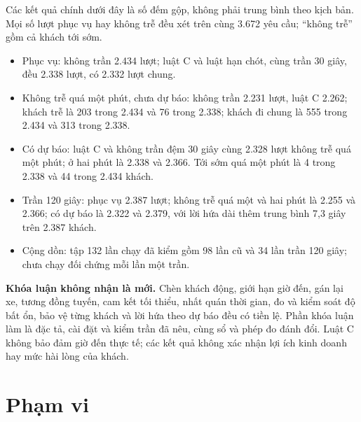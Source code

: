 Các kết quả chính dưới đây là số đếm gộp, không phải trung bình theo kịch bản. Mọi số lượt phục vụ hay không trễ
đều xét trên cùng 3.672 yêu cầu; “không trễ” gồm cả khách tới sớm.
\begin{itemize}[leftmargin=0.7cm,itemsep=2pt,topsep=3pt]
\item Phục vụ: không trần 2.434 lượt; luật C và luật hạn chót, cùng trần 30 giây, đều 2.338 lượt, có 2.332 lượt chung.
\item Không trễ quá một phút, chưa dự báo: không trần 2.231 lượt, luật C 2.262; khách trễ là 203 trong 2.434 và
76 trong 2.338; khách đi chung là 555 trong 2.434 và 313 trong 2.338.
\item Có dự báo: luật C và không trần đệm 30 giây cùng 2.328 lượt không trễ quá một phút; ở hai phút là 2.338
và 2.366. Tới sớm quá một phút là 4 trong 2.338 và 44 trong 2.434 khách.
\item Trần 120 giây: phục vụ 2.387 lượt; không trễ quá một và hai phút là 2.255 và 2.366; có dự báo là 2.322 và
2.379, với lời hứa dài thêm trung bình 7,3 giây trên 2.387 khách.
\item Cộng dồn: tập 132 lần chạy đã kiểm gồm 98 lần cũ và 34 lần trần 120 giây; chưa chạy đối chứng mỗi lần một trần.
\end{itemize}

\begin{khungy}
\textbf{Khóa luận không nhận là mới.}
Chèn khách động, giới hạn giờ đến, gán lại xe, tương đồng tuyến, cam kết tối thiểu, nhất quán thời gian, đo và
kiểm soát độ bất ổn, bảo vệ từng khách và lời hứa theo dự báo đều có tiền lệ. Phần khóa luận làm là đặc tả,
cài đặt và kiểm trần đã nêu, cùng sổ và phép đo đánh đổi. Luật C không bảo đảm giờ đến thực tế; các kết quả
không xác nhận lợi ích kinh doanh hay mức hài lòng của khách.
\end{khungy}

\section{Phạm vi}
\label{muc:c1-phamvi}

